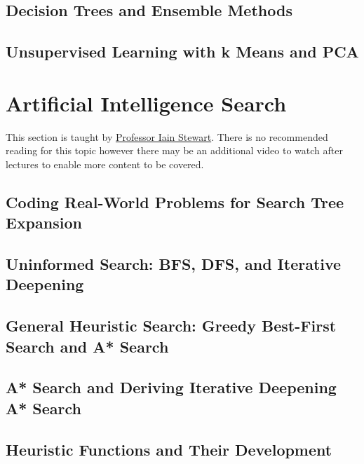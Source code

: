 \subsection{Decision Trees and Ensemble Methods}

\subsection{Unsupervised Learning with k Means and PCA}

\section{Artificial Intelligence Search}

This section is taught by \hyperref[lecturer-iainstewart]{Professor Iain Stewart}. There is no recommended reading for this topic however there may be an additional video to watch after lectures to enable more content to be covered. 


\subsection{Coding Real-World Problems for Search Tree Expansion}


\subsection{Uninformed Search: BFS, DFS, and Iterative Deepening}


\subsection{General Heuristic Search: Greedy Best-First Search and A* Search}

\subsection{A* Search and Deriving Iterative Deepening A* Search}

\subsection{Heuristic Functions and Their Development}

